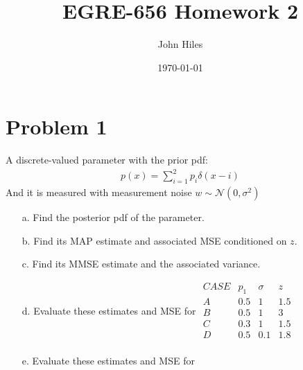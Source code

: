 \documentclass{article}
\title{EGRE-656 Homework 2}
\author{John Hiles}
\date\today
\begin{document}
\maketitle %


\section*{Problem 1}
A discrete-valued parameter with the prior pdf:
\begin{align*}
p(x) = \sum_{i=1}^{2} p_i \delta(x-i)
\end{align*}
And it is measured with measurement noise $w \sim \mathcal{N}(0,\sigma^2)$
\begin{enumerate}
\item[a.] Find the posterior pdf of the parameter.
\item[b.] Find its MAP estimate and associated MSE conditioned on $z$.
\item[c.] Find its MMSE estimate and the associated variance.
\item[d.] Evaluate these estimates and MSE for 
$\begin{matrix}
CASE & p_1 & \sigma & z \\
A & 0.5 & 1 & 1.5 \\
B & 0.5 & 1 & 3 \\
C & 0.3 & 1 & 1.5 \\
D & 0.5 & 0.1 & 1.8 \\
\end{matrix}$
\item[e.] Evaluate these estimates and MSE for 
\end{enumerate}
\end{document}
